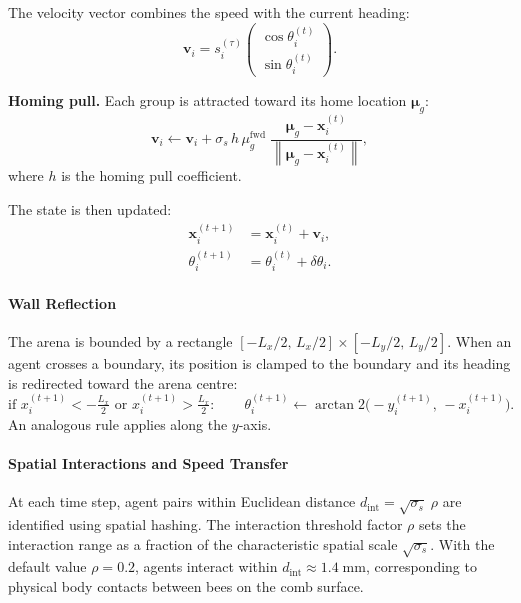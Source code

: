 \documentclass{article}
\newcommand{\vect}[1]{\mathbf{#1}}
\newcommand{\norm}[1]{\left\lVert #1 \right\rVert}
\begin{document}
{The velocity vector combines the speed with the current heading:
%
\begin{equation}
  \vect{v}_i = s_i^{(\tau)} \begin{pmatrix} \cos\theta_i^{(t)} \\ \sin\theta_i^{(t)} \end{pmatrix}.
\end{equation}

\textbf{Homing pull.}
Each group is attracted toward its home location $\vect{\mu}_g$:
%
\begin{equation}
  \vect{v}_i \leftarrow \vect{v}_i
    + \sigma_s \, h \, \mu_g^{\mathrm{fwd}}
      \;\frac{\vect{\mu}_g - \vect{x}_i^{(t)}}
             {\norm{\vect{\mu}_g - \vect{x}_i^{(t)}}},
\end{equation}
%
where $h$ is the homing pull coefficient.

The state is then updated:
%
\begin{align}
  \vect{x}_i^{(t+1)} &= \vect{x}_i^{(t)} + \vect{v}_i, \\
  \theta_i^{(t+1)}    &= \theta_i^{(t)} + \delta\theta_i.
\end{align}

\paragraph{Wall Reflection}

The arena is bounded by a rectangle
$[{-L_x/2},\, {L_x/2}] \times [{-L_y/2},\, {L_y/2}]$.
When an agent crosses a boundary, its position is clamped to the boundary and
its heading is redirected toward the arena centre:
%
\begin{equation}
  \text{if } x_i^{(t+1)} < -\tfrac{L_x}{2} \text{ or } x_i^{(t+1)} > \tfrac{L_x}{2}:
  \qquad
  \theta_i^{(t+1)} \leftarrow \arctan2\!\bigl(-y_i^{(t+1)},\, -x_i^{(t+1)}\bigr).
\end{equation}
%
An analogous rule applies along the $y$-axis.

\paragraph{Spatial Interactions and Speed Transfer}

At each time step, agent pairs within Euclidean distance
$d_{\mathrm{int}} = \sqrt{\sigma_s}\;\rho$ are identified using spatial
hashing.  The interaction threshold factor $\rho$ sets the interaction range
as a fraction of the characteristic spatial scale $\sqrt{\sigma_s}$.  With the
default value $\rho = 0.2$, agents interact within
$d_{\mathrm{int}} \approx 1.4\;\mathrm{mm}$, corresponding to physical body
contacts between bees on the comb surface.

}
\end{document}
